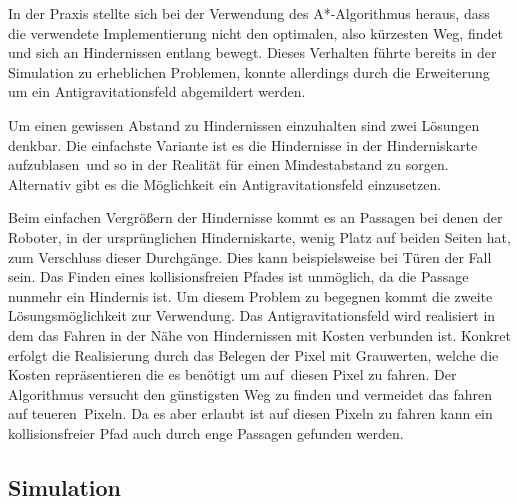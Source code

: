
In der Praxis stellte sich bei der Verwendung des A*-Algorithmus heraus, dass die verwendete Implementierung nicht den optimalen, also kürzesten Weg, findet und sich an Hindernissen entlang bewegt. Dieses Verhalten führte bereits in der Simulation zu erheblichen Problemen, konnte allerdings durch die Erweiterung um ein Antigravitationsfeld abgemildert werden.

Um einen gewissen Abstand zu Hindernissen einzuhalten sind zwei Lösungen denkbar. Die einfachste Variante ist es die Hindernisse in der Hinderniskarte \glqq aufzublasen\grqq\ und so in der Realität für einen Mindestabstand zu sorgen. Alternativ gibt es die Möglichkeit ein Antigravitationsfeld einzusetzen. 

Beim einfachen Vergrößern der Hindernisse kommt es an Passagen bei denen der Roboter, in der ursprünglichen Hinderniskarte, wenig Platz auf beiden Seiten hat, zum Verschluss dieser Durchgänge. Dies kann beispielsweise bei Türen der Fall sein. Das Finden eines kollisionsfreien Pfades ist unmöglich, da die Passage nunmehr ein Hindernis ist. Um diesem Problem zu begegnen kommt die zweite Lösungsmöglichkeit zur Verwendung. Das Antigravitationsfeld wird realisiert in dem das Fahren in der Nähe von Hindernissen mit Kosten verbunden ist. Konkret erfolgt die Realisierung durch das Belegen der Pixel mit Grauwerten, welche die Kosten repräsentieren die es benötigt um \glqq auf\grqq\ diesen Pixel zu fahren. Der Algorithmus versucht den günstigsten Weg zu finden und vermeidet das fahren auf \glqq teueren\grqq\ Pixeln. Da es aber erlaubt ist auf diesen Pixeln zu fahren kann ein kollisionsfreier Pfad auch durch enge Passagen gefunden werden.



\subsection{Simulation}
\label{simulation_subsec}
\authorsection{\editoroier}

